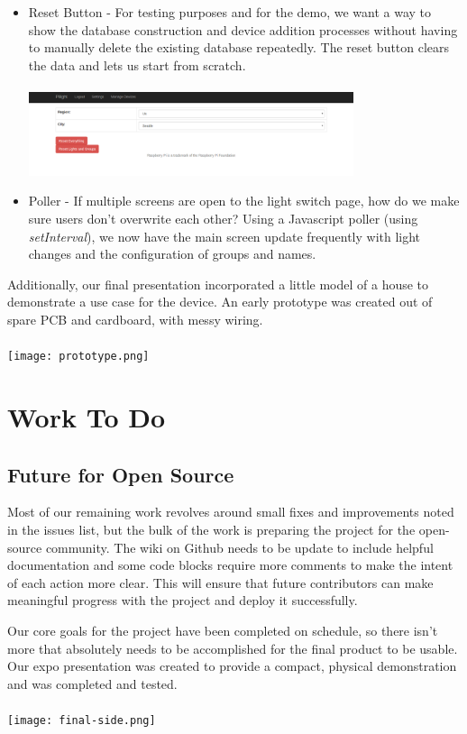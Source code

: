 \documentclass[10pt,draftclsnofoot,onecolumn]{IEEEtran}
\begin{document}
\begin{itemize}
   \item Reset Button
         - For testing purposes and for the demo, we want a way to show the database
           construction and device addition processes without having to manually
           delete the existing database repeatedly. The reset button clears the
           data and lets us start from scratch.\\ \\
           \includegraphics[width=0.75\textwidth]{reset-button.png}
   \item Poller
         - If multiple screens are open to the light switch page, how do we make sure users don't overwrite each other?
           Using a Javascript poller (using \textit{setInterval}), we now have the main screen update frequently with
           light changes and the configuration of groups and names.
\end{itemize}

Additionally, our final presentation incorporated a little model of a house to demonstrate
a use case for the device. An early prototype was created out of spare PCB and cardboard, with
messy wiring.\\ \\
\texttt{[image: prototype.png]}

\section{Work To Do}
\subsection{Future for Open Source}
Most of our remaining work revolves around small fixes and improvements noted in the
issues list, but the bulk of the work is preparing the project for the open-source community.
The wiki on Github needs to be update to include helpful documentation and some code blocks
require more comments to make the intent of each action more clear. This will ensure that future
contributors can make meaningful progress with the project and deploy it successfully.

Our core goals for the project have been completed on schedule, so there isn't more that absolutely
needs to be accomplished for the final product to be usable. Our expo presentation was created to provide
a compact, physical demonstration and was completed and tested.\\ \\
\texttt{[image: final-side.png]}
\end{document}

